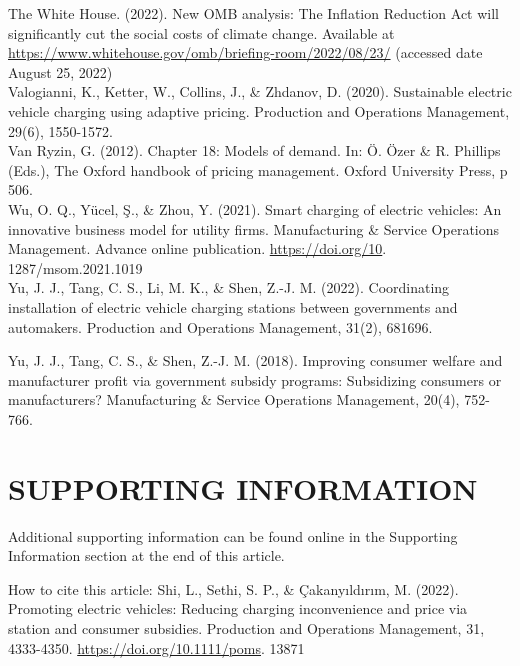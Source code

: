 \documentclass[10pt]{article}
\begin{document}
The White House. (2022). New OMB analysis: The Inflation Reduction Act will significantly cut the social costs of climate change. Available at \href{https://www.whitehouse.gov/omb/briefing-room/2022/08/23/}{https://www.whitehouse.gov/omb/briefing-room/2022/08/23/} (accessed date August 25, 2022)\\
Valogianni, K., Ketter, W., Collins, J., \& Zhdanov, D. (2020). Sustainable electric vehicle charging using adaptive pricing. Production and Operations Management, 29(6), 1550-1572.\\
Van Ryzin, G. (2012). Chapter 18: Models of demand. In: Ö. Özer \& R. Phillips (Eds.), The Oxford handbook of pricing management. Oxford University Press, p 506.\\
Wu, O. Q., Yücel, Ş., \& Zhou, Y. (2021). Smart charging of electric vehicles: An innovative business model for utility firms. Manufacturing \& Service Operations Management. Advance online publication. \href{https://doi.org/10}{https://doi.org/10}. 1287/msom.2021.1019\\
Yu, J. J., Tang, C. S., Li, M. K., \& Shen, Z.-J. M. (2022). Coordinating installation of electric vehicle charging stations between governments and automakers. Production and Operations Management, 31(2), 681696.

Yu, J. J., Tang, C. S., \& Shen, Z.-J. M. (2018). Improving consumer welfare and manufacturer profit via government subsidy programs: Subsidizing consumers or manufacturers? Manufacturing \& Service Operations Management, 20(4), 752-766.

\section*{SUPPORTING INFORMATION}
Additional supporting information can be found online in the Supporting Information section at the end of this article.

How to cite this article: Shi, L., Sethi, S. P., \& Çakanyıldırım, M. (2022). Promoting electric vehicles: Reducing charging inconvenience and price via station and consumer subsidies. Production and Operations Management, 31, 4333-4350. \href{https://doi.org/10.1111/poms}{https://doi.org/10.1111/poms}. 13871
\end{document}
